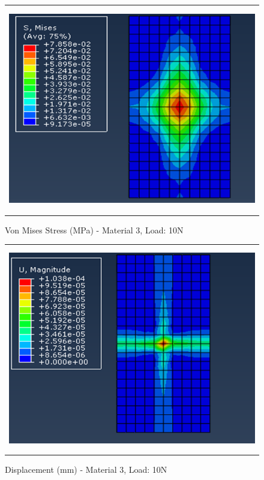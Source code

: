 \documentclass[a4paper,12pt]{article}
\numberwithin{equation}{section}
\numberwithin{figure}{section}
\begin{document}
\begin{figure}[H]
  \centering
  \begin{tabular}{@{}c@{}}
    \includegraphics[width=0.7\linewidth,height=255pt]{Results/Point Loading/M3_VMS_L2.png} \\
  \end{tabular}
  \caption{Von Mises Stress (MPa) - Material 3, Load: 10N}
\end{figure}

\begin{figure}[H]
  \centering
  \begin{tabular}{@{}c@{}}
    \includegraphics[width=0.7\linewidth,height=255pt]{Results/Point Loading/M3_DIS_L2.png} \\
  \end{tabular}
  \caption{Displacement (mm) - Material 3, Load: 10N}
\end{figure}
\end{document}
